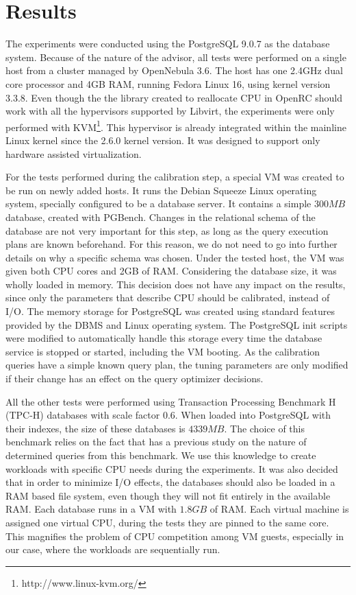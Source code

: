 \chapter{Results}

\label{chap:results}

The experiments were conducted using the PostgreSQL 9.0.7 as the database system. Because of the nature of the advisor, all tests were performed on a single host from a cluster managed by OpenNebula 3.6. The host has one 2.4GHz dual core processor and 4GB RAM, running Fedora Linux 16, using kernel version 3.3.8. Even though the the library created to reallocate CPU in OpenRC should work with all the hypervisors supported by Libvirt, the experiments were only performed with KVM\footnote{http://www.linux-kvm.org/}. This hypervisor is already integrated within the mainline Linux kernel since the 2.6.0 kernel version. It was designed to support only hardware assisted virtualization.

For the tests performed during the calibration step, a special VM was created to be run on newly added hosts. It runs the Debian Squeeze Linux operating system, specially configured to be a database server. It contains a simple $300MB$ database, created with PGBench. Changes in the relational schema of the database are not very important for this step, as long as the query execution plans are known beforehand. For this reason, we do not need to go into further details on why a specific schema was chosen. Under the tested host, the VM was given both CPU cores and 2GB of RAM. Considering the database size, it was wholly loaded in memory. This decision does not have any impact on the results, since only the parameters that describe CPU should be calibrated, instead of I/O. The memory storage for PostgreSQL was created using standard features provided by the DBMS and Linux operating system. The PostgreSQL init scripts were modified to automatically handle this storage every time the database service is stopped or started, including the VM booting. As the calibration queries have a simple known query plan, the tuning parameters are only modified if their change has an effect on the query optimizer decisions.

All the other tests were performed using Transaction Processing Benchmark H (TPC-H) databases with scale factor $0.6$. When loaded into PostgreSQL with their indexes, the size of these databases is $4339 MB$.  The choice of this benchmark relies on the fact that \cite{Soror:2008:AVM:1376616.1376711} has a previous study on the nature of determined queries from this benchmark. We use this knowledge to create workloads with specific CPU needs during the experiments.  It was also decided that in order to minimize I/O effects, the databases should also be loaded  in a RAM based file system, even though they will not fit entirely in the available RAM. Each database runs in a VM with $1.8 GB$ of RAM.  Each virtual machine is assigned one virtual CPU, during the tests they are pinned to the same core. This magnifies the problem of CPU competition among VM guests, especially in our case, where the workloads are sequentially run. 

